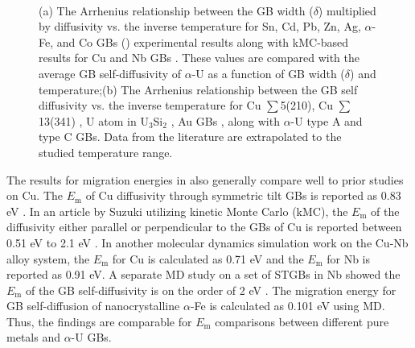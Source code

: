 \documentclass[review]{elsarticle}
\begin{document}
\begin{figure}[h!]
\centering
{}
\\
\caption{(a) The Arrhenius relationship between the GB width ($\delta$) multiplied by diffusivity vs. the inverse temperature for Sn, Cd, Pb, Zn, Ag, $\alpha$-Fe, and Co GBs (\cite{diffusion_compare}) experimental results along with kMC-based results for Cu and Nb GBs \cite{cu_nb}. These values are compared with the average GB self-diffusivity of $\alpha$-U as a function of GB width ($\delta$) and temperature;(b) The Arrhenius relationship between the GB self diffusivity vs. the inverse temperature for Cu $\sum$5(210), Cu $\sum$13(341) \cite{Suzuki2003}, U atom in U$_\mathrm{3}$Si$_\mathrm{2}$ \cite{COOPER2021153129}, Au GBs \cite{diffusion_compare}, along with $\alpha$-U type A and type C GBs. Data from the literature are extrapolated to the studied temperature range.}
\label{fig:diff_comp}
\end{figure}


The results for migration energies in  also generally compare well to prior studies on Cu. The $E_{\mathrm{m}}$ of Cu diffusivity through symmetric tilt GBs is reported as 0.83 eV \cite{AginCu}. In an article by Suzuki \cite{Suzuki2003} utilizing kinetic Monte Carlo (kMC), the $E_{\mathrm{m}}$ of the diffusivity either parallel or perpendicular to the GBs of Cu is reported between 0.51 eV to 2.1 eV \cite{Suzuki2003}. In another molecular dynamics simulation work on the Cu-Nb alloy system, the $E_{\mathrm{m}}$ for Cu is calculated as 0.71 eV and the $E_{\mathrm{m}}$ for Nb is reported as 0.91 eV\cite{cu_nb}. A separate MD study on a set of STGBs in Nb showed the $E_{\mathrm{m}}$ of the GB self-diffusivity is on the order of 2 eV \cite{Popov2022}. The migration energy for GB self-diffusion of nanocrystalline $\alpha$-Fe \cite{MOHAMMADZADEH201756} is calculated as 0.101 eV using MD. Thus, the findings are comparable for $E_{\mathrm{m}}$ comparisons between different pure metals and $\alpha$-U GBs.
\end{document}
